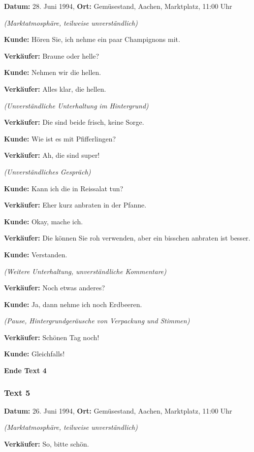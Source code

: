 \documentclass[
]{article}
\begin{document}
\textbf{Datum:} 28. Juni 1994, \textbf{Ort:} Gemüsestand, Aachen,
Marktplatz, 11:00 Uhr

\emph{(Marktatmosphäre, teilweise unverständlich)}

\textbf{Kunde:} Hören Sie, ich nehme ein paar Champignons mit.

\textbf{Verkäufer:} Braune oder helle?

\textbf{Kunde:} Nehmen wir die hellen.

\textbf{Verkäufer:} Alles klar, die hellen.

\emph{(Unverständliche Unterhaltung im Hintergrund)}

\textbf{Verkäufer:} Die sind beide frisch, keine Sorge.

\textbf{Kunde:} Wie ist es mit Pfifferlingen?

\textbf{Verkäufer:} Ah, die sind super!

\emph{(Unverständliches Gespräch)}

\textbf{Kunde:} Kann ich die in Reissalat tun?

\textbf{Verkäufer:} Eher kurz anbraten in der Pfanne.

\textbf{Kunde:} Okay, mache ich.

\textbf{Verkäufer:} Die können Sie roh verwenden, aber ein bisschen
anbraten ist besser.

\textbf{Kunde:} Verstanden.

\emph{(Weitere Unterhaltung, unverständliche Kommentare)}

\textbf{Verkäufer:} Noch etwas anderes?

\textbf{Kunde:} Ja, dann nehme ich noch Erdbeeren.

\emph{(Pause, Hintergrundgeräusche von Verpackung und Stimmen)}

\textbf{Verkäufer:} Schönen Tag noch!

\textbf{Kunde:} Gleichfalls!

\textbf{Ende Text 4}

\subsubsection{\texorpdfstring{\textbf{Text 5}}{Text 5}}\label{text-5}

\textbf{Datum:} 26. Juni 1994, \textbf{Ort:} Gemüsestand, Aachen,
Marktplatz, 11:00 Uhr

\emph{(Marktatmosphäre, teilweise unverständlich)}

\textbf{Verkäufer:} So, bitte schön.
\end{document}
